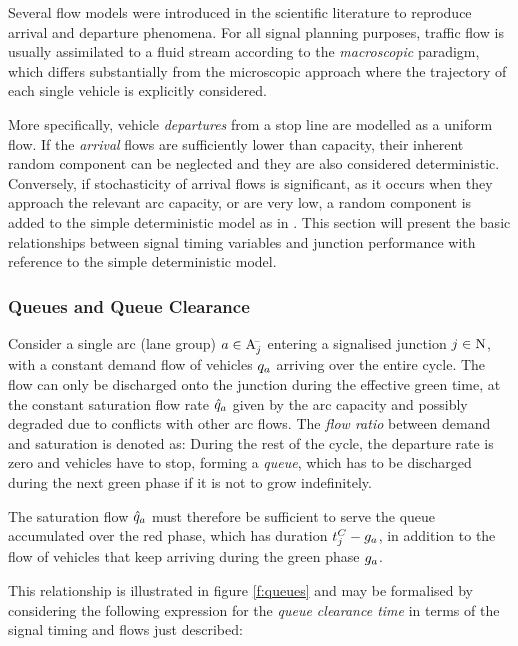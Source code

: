 Several flow models were introduced in the scientific literature to reproduce arrival and departure phenomena.
For all signal planning purposes, traffic flow is usually assimilated to a fluid stream according to the \emph{macroscopic} paradigm, which differs substantially from the microscopic approach where the trajectory of each single vehicle is explicitly considered.

More specifically, vehicle \emph{departures} from a stop line are modelled as a uniform flow. If the \emph{arrival} flows are sufficiently lower than capacity, their inherent random component can be neglected and they are also considered deterministic.
Conversely, if stochasticity of arrival flows is significant, as it occurs when they approach the relevant arc capacity, or are very low, a random component is added to the simple deterministic model as in .
This section will present the basic relationships between signal timing variables and junction performance with reference to the simple deterministic model.

\subsubsection*{Queues and Queue Clearance}
Consider a single arc (lane group) $a \in \mathrm{A}_{j}^{\scriptscriptstyle{\hspace{-2pt}-}}$ entering a signalised junction $j \in \mathrm{N}$, with a constant demand flow of vehicles $q_a$ arriving over the entire cycle. The flow can only be discharged onto the junction during the effective green time, at the constant saturation flow rate $\hat{q}_a$ given by the arc capacity and possibly degraded due to conflicts with other arc flows. The \emph{flow ratio} between demand and saturation is denoted as:
During the rest of the cycle, the departure rate is zero and vehicles have to stop, forming a \emph{queue}, which has to be discharged during the next green phase if it is not to grow indefinitely. 

The saturation flow $\hat{q}_a$ must therefore be sufficient to serve the queue accumulated over the red phase, which has duration $t_{j}^C-g_{a}$, in addition to the flow of vehicles that keep arriving during the green phase $g_{a}$.

This relationship is illustrated in figure \ref{f:queues} and may be formalised by considering the following expression for the \emph{queue clearance time} in terms of the signal timing and flows just described:

